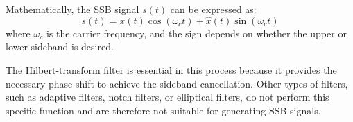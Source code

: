 Mathematically, the SSB signal \( s(t) \) can be expressed as:
\[
s(t) = x(t) \cos(\omega_c t) \mp \hat{x}(t) \sin(\omega_c t)
\]
where \( \omega_c \) is the carrier frequency, and the sign depends on whether the upper or lower sideband is desired.

The Hilbert-transform filter is essential in this process because it provides the necessary phase shift to achieve the sideband cancellation. Other types of filters, such as adaptive filters, notch filters, or elliptical filters, do not perform this specific function and are therefore not suitable for generating SSB signals.


